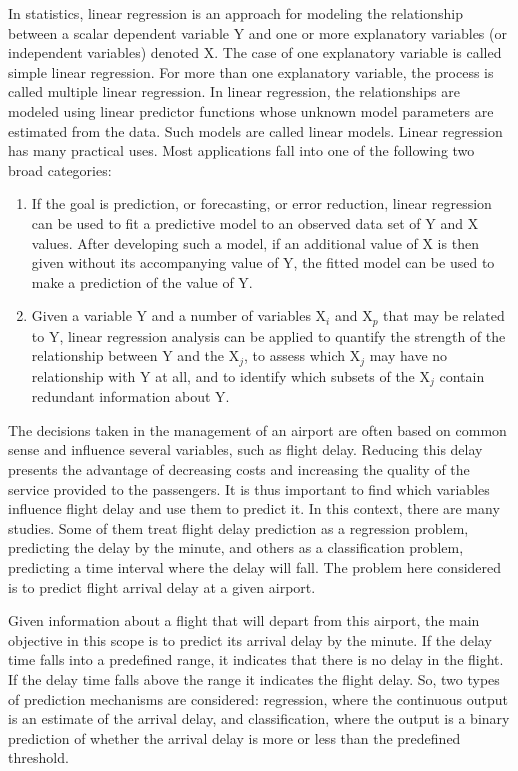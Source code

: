 \documentclass[conference]{IEEEtran}
\begin{document}
In statistics, linear regression is an approach for modeling the relationship between a scalar dependent variable Y and one or more explanatory variables (or independent variables) denoted X. The case of one explanatory variable is called simple linear regression. For more than one explanatory variable, the process is called multiple linear regression. In linear regression, the relationships are modeled using linear predictor functions whose unknown model parameters are estimated from the data. Such models are called linear models. Linear regression has many practical uses. Most applications fall into one of the following two broad categories: 
\begin{enumerate}
    
\item If the goal is prediction, or forecasting, or error reduction, linear regression can be used to fit a predictive model to an observed data set of Y and X values. After developing such a model, if an additional value of X is then given without its accompanying value of Y, the fitted model can be used to make a prediction of the value of Y. 
\item Given a variable Y and a number of variables X$_i$ and X$_p$ that may be related to Y, linear regression analysis can be applied to quantify the strength of the relationship between Y and the X$_j$, to assess which X$_j$ may have no relationship with Y at all, and to identify which subsets of the X$_j$ contain redundant information about Y.
\end{enumerate}
The decisions taken in the management of an airport are often based on common sense and influence several variables, such as flight delay. Reducing this delay presents the advantage of decreasing costs and increasing the quality of the service provided to the passengers. It is thus important to find which variables influence flight delay and use them to predict it. In this context, there are many studies. Some of them treat flight delay prediction as a regression problem, predicting the delay by the minute, and others as a classification problem, predicting a time interval where the delay will fall. The problem here considered is to predict flight arrival delay at a given airport. 

Given information about a flight that will depart from this airport, the main objective in this scope is to predict its arrival delay by the minute. If the delay time falls into a predefined range, it indicates that there is no delay in the flight. If the delay time falls above the range it indicates the flight delay. So, two types of prediction mechanisms are considered: regression, where the continuous output is an estimate of the arrival delay, and classification, where the output is a binary prediction of whether the arrival delay is more or less than the predefined threshold.
\end{document}
